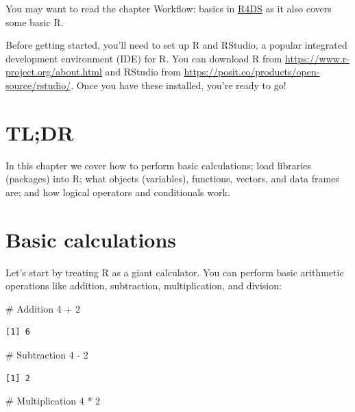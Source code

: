 \documentclass[
  letterpaper,
  DIV=11,
  numbers=noendperiod]{scrreprt}
\newenvironment{Shaded}{\begin{snugshade}}{\end{snugshade}}
\newcommand{\CommentTok}[1]{\textcolor[rgb]{0.37,0.37,0.37}{#1}}
\newcommand{\DecValTok}[1]{\textcolor[rgb]{0.68,0.00,0.00}{#1}}
\newcommand{\SpecialCharTok}[1]{\textcolor[rgb]{0.37,0.37,0.37}{#1}}
\begin{document}
You may want to read the chapter Workflow: basics in
\href{https://r4ds.hadley.nz/}{R4DS} as it also covers some basic R.

Before getting started, you'll need to set up R and RStudio, a popular
integrated development environment (IDE) for R. You can download R from
\url{https://www.r-project.org/about.html} and RStudio from
\url{https://posit.co/products/open-source/rstudio/}. Once you have
these installed, you're ready to go!

\section{TL;DR}\label{tldr}

In this chapter we cover how to perform basic calculations; load
libraries (packages) into R; what objects (variables), functions,
vectors, and data frames are; and how logical operators and conditionals
work.

\section{Basic calculations}\label{basic-calculations}

Let's start by treating R as a giant calculator. You can perform basic
arithmetic operations like addition, subtraction, multiplication, and
division:

\begin{Shaded}
\begin{Highlighting}[]
\CommentTok{\# Addition}
\DecValTok{4} \SpecialCharTok{+} \DecValTok{2}
\end{Highlighting}
\end{Shaded}

\begin{verbatim}
[1] 6
\end{verbatim}

\begin{Shaded}
\begin{Highlighting}[]
\CommentTok{\# Subtraction}
\DecValTok{4} \SpecialCharTok{{-}} \DecValTok{2}
\end{Highlighting}
\end{Shaded}

\begin{verbatim}
[1] 2
\end{verbatim}

\begin{Shaded}
\begin{Highlighting}[]
\CommentTok{\# Multiplication}
\DecValTok{4} \SpecialCharTok{*} \DecValTok{2}
\end{Highlighting}
\end{Shaded}
\end{document}
